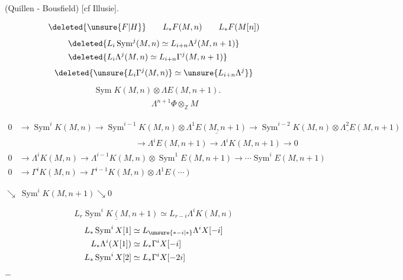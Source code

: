  (Quillen - Bousfield) [cf  Illusie].

\[
\deleted{\unsure{F|H}}\qquad L_{*}F(M,n)\qquad L_{*}F(M[n])
\]
\[
\begin{aligned}
&\deleted{L_i\operatorname{Sym}^{j}(M,n)\simeq L_{i+n}\Lambda^{j}(M,n+1)}\\
&\deleted{L_i\Lambda^{j}(M,n)\simeq L_{i+n}\Gamma^{j}(M,n+1)}
\end{aligned}
\]
\[
\deleted{\unsure{L_i\Gamma^{j}(M,n)}\simeq\unsure{L_{i+n}\Lambda^{j}}}
\]
\[
\begin{aligned}
&\operatorname{Sym} K(M,n)\otimes\Lambda E(M,n+1).\\
&\hspace{7em}\Lambda^{n+1}\Phi\otimes_{\mathbb Z}M
\end{aligned}
\]

{\scriptsize
\[
\begin{aligned}
0&\longrightarrow\operatorname{Sym}^{i}K(M,n)\longrightarrow
\operatorname{Sym}^{i-1}K(M,n)\otimes\underline{\Lambda^{1}E(M,n+1)}
\longrightarrow\operatorname{Sym}^{i-2}K(M,n)\otimes\underline{\Lambda^{2}E}(M,n+1)\\
&\hspace{14em}\longrightarrow\Lambda^{i}E(M,n+1)\longrightarrow\Lambda^{i}K(M,n+1)\longrightarrow0
\end{aligned}
\]
\[
\begin{aligned}
0&\longrightarrow\Lambda^{i}K(M,n)\longrightarrow\Lambda^{i-1}K(M,n)\otimes\operatorname{Sym}^{1}E(M,n+1)
\longrightarrow\cdots\operatorname{Sym}^{i}E(M,n+1)\\[-1pt]
0&\longrightarrow\Gamma^{i}K(M,n)\longrightarrow\Gamma^{i-1}K(M,n)\otimes\Lambda^{1}E(\cdots)
\end{aligned}
\]
}
\begin{flushright}
$\searrow\ \operatorname{Sym}^{i}K(M,n+1)\searrow 0$
\end{flushright}
\[
\boxed{\underline{L_r\operatorname{Sym}^{i}K(M,n+1)}\simeq L_{r-i}\Lambda^{i}K(M,n)}
\]
\[
\begin{aligned}
L_{*}\operatorname{Sym}^{i}X[1]&\simeq L_{\unsure{*-i|*}}\Lambda^{i}X[-i]\\
L_{*}\Lambda^{i}(X[1])&\simeq L_{*}\Gamma^{i}X[-i]\\
L_{*}\operatorname{Sym}^{i}X[2]&\simeq L_{*}\Gamma^{i}X[-2i]
\end{aligned}
\]
\noindent $-$
